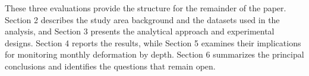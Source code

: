 These three evaluations provide the structure for the remainder of the paper.
Section 2 describes the study area background and the datasets used in the analysis, and Section 3 presents the analytical approach and experimental designs. Section 4 reports the results, while Section 5 examines their implications for monitoring monthly deformation by depth. Section 6 summarizes the principal conclusions and identifies the questions that remain open.
